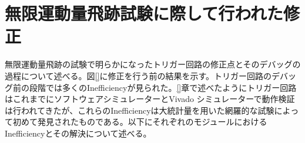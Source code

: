 
\section{無限運動量飛跡試験に際して行われた修正}
\label{sec:appendix:infinite-momentum-tracks}
無限運動量飛跡の試験で明らかになったトリガー回路の修正点とそのデバッグの過程について述べる。図\ref{}に修正を行う前の結果を示す。トリガー回路のデバッグ前の段階では多くのInefficiencyが見られた。\ref{}章で述べたようにトリガー回路はこれまでにソフトウェアシミュレーターとVivado シミュレーターで動作検証は行われてきたが、これらのInefficiencyは大統計量を用いた網羅的な試験によって初めて発見されたものである。以下にそれぞれのモジュールにおけるInefficiencyとその解決について述べる。

